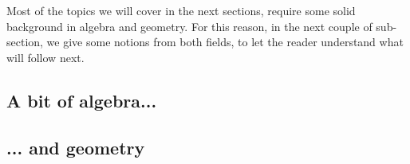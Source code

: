 \documentclass{subfiles}
\begin{document}
    Most of the topics we will cover in the next sections, 
        require some solid background in algebra and geometry.
        For this reason, in the next couple of sub-section,
        we give some notions from both fields,
        to let the reader understand what will follow next.

    \subsection{A bit of algebra...}
    

    \subsection{... and geometry}
    
\end{document}
